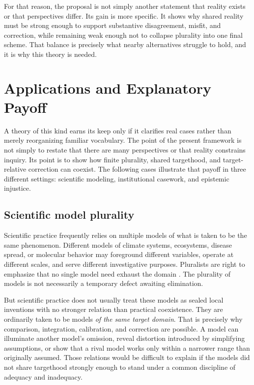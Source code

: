 \documentclass[11pt]{article}
\renewcommand{\emph}[1]{\textit{#1}}
\begin{document}
For that reason, the proposal is not simply another statement that reality exists or that perspectives differ. Its gain is more specific. It shows why shared reality must be strong enough to support substantive disagreement, misfit, and correction, while remaining weak enough not to collapse plurality into one final scheme. That balance is precisely what nearby alternatives struggle to hold, and it is why this theory is needed.
\section{Applications and Explanatory Payoff}

A theory of this kind earns its keep only if it clarifies real cases rather than merely reorganizing familiar vocabulary. The point of the present framework is not simply to restate that there are many perspectives or that reality constrains inquiry. Its point is to show how finite plurality, shared targethood, and target-relative correction can coexist. The following cases illustrate that payoff in three different settings: scientific modeling, institutional casework, and epistemic injustice.

\subsection{Scientific model plurality}

Scientific practice frequently relies on multiple models of what is taken to be the same phenomenon. Different models of climate systems, ecosystems, disease spread, or molecular behavior may foreground different variables, operate at different scales, and serve different investigative purposes. Pluralists are right to emphasize that no single model need exhaust the domain \cite{Ludwig2021ScientificPluralismSEP,Veit2020ModelPluralism}. The plurality of models is not necessarily a temporary defect awaiting elimination.

But scientific practice does not usually treat these models as sealed local inventions with no stronger relation than practical coexistence. They are ordinarily taken to be models \emph{of the same target domain}. That is precisely why comparison, integration, calibration, and correction are possible. A model can illuminate another model's omission, reveal distortion introduced by simplifying assumptions, or show that a rival model works only within a narrower range than originally assumed. Those relations would be difficult to explain if the models did not share targethood strongly enough to stand under a common discipline of adequacy and inadequacy.
\end{document}
